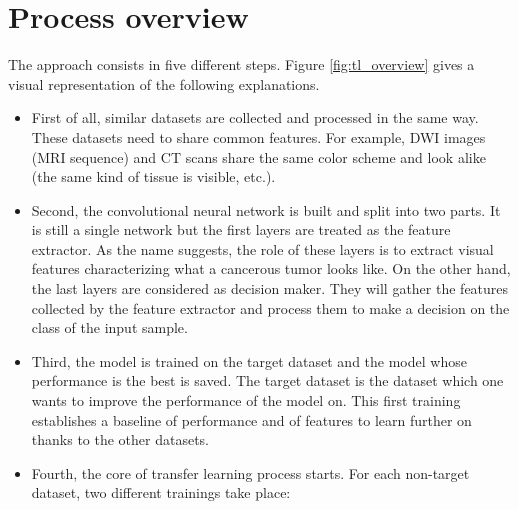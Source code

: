 \section{Process overview}
\label{sec:process_overview}
\setlength{\marginparwidth}{3cm}\leavevmode {}The approach consists in five different steps. Figure \ref{fig:tl_overview} gives a visual representation of the following explanations.\\
\begin{itemize}
\item First of all, similar datasets are collected and processed in the same way. These datasets need to share common features. For example, DWI images (MRI sequence) and CT scans share the same color scheme and look alike (the same kind of tissue is visible, etc.).
\item Second, the convolutional neural network is built and split into two parts. It is still a single network but the first layers are treated as the feature extractor. As the name suggests, the role of these layers is to extract visual features characterizing what a cancerous tumor looks like. On the other hand, the last layers are considered as decision maker. They will gather the features collected by the feature extractor and process them to make a decision on the class of the input sample.
\item Third, the model is trained on the target dataset and the model whose performance is the best is saved. The target dataset is the dataset which one wants to improve the performance of the model on. This first training establishes a baseline of performance and of features to learn further on thanks to the other datasets.
\item Fourth, the core of transfer learning process starts. For each non-target dataset, two different trainings take place:


\end{itemize}
